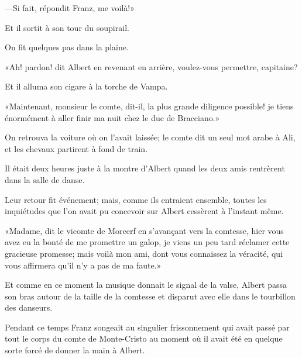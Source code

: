 —Si fait, répondit Franz, me voilà!» 

Et il sortit à son tour du soupirail. 

On fit quelques pas dans la plaine. 

«Ah! pardon! dit Albert en revenant en arrière, voulez-vous permettre, capitaine? 

Et il alluma son cigare à la torche de Vampa. 

«Maintenant, monsieur le comte, dit-il, la plus grande diligence possible! je tiens énormément à aller finir ma nuit chez le duc de Bracciano.» 

On retrouva la voiture où on l'avait laissée; le comte dit un seul mot arabe à Ali, et les chevaux partirent à fond de train. 

Il était deux heures juste à la montre d'Albert quand les deux amis rentrèrent dans la salle de danse. 

Leur retour fit événement; mais, comme ils entraient ensemble, toutes les inquiétudes que l'on avait pu concevoir sur Albert cessèrent à l'instant même. 

«Madame, dit le vicomte de Morcerf en s'avançant vers la comtesse, hier vous avez eu la bonté de me promettre un galop, je viens un peu tard réclamer cette gracieuse promesse; mais voilà mon ami, dont vous connaissez la véracité, qui vous affirmera qu'il n'y a pas de ma faute.» 

Et comme en ce moment la musique donnait le signal de la valse, Albert passa son bras autour de la taille de la comtesse et disparut avec elle dans le tourbillon des danseurs. 

Pendant ce temps Franz songeait au singulier frissonnement qui avait passé par tout le corps du comte de Monte-Cristo au moment où il avait été en quelque sorte forcé de donner la main à Albert. 